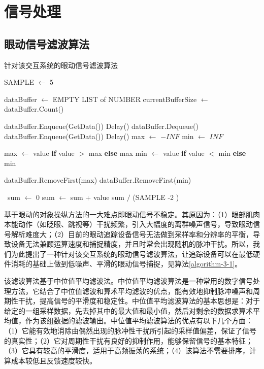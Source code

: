 \section{信号处理}

\subsection{眼动信号滤波算法}

\begin{algorithm}[b!]
    \caption{针对该交互系统的眼动信号滤波算法}
	\begin{algorithmic}[1]
        \State SAMPLE $\leftarrow$ 5
 
        \State dataBuffer $\leftarrow$ EMPTY LIST of NUMBER
        \State currentBufferSize $\leftarrow$ dataBuffer.Count()

            \State dataBuffer.Enqueue(GetData())
            \State Delay()
        \EndFor
        \Else
        \State dataBuffer.Dequeue()
        \State dataBuffer.Enqueue(GetData())
        \State Delay()
        \EndIf
        \State
        \State max $\leftarrow$ $-INF$
        \State min $\leftarrow$ $INF$
        
            \State max $\leftarrow$ value \textbf{if} value $>$ max \textbf{else} max
            \State min $\leftarrow$ value \textbf{if} value $<$ min \textbf{else} min
        \EndFor

        \State dataBuffer.RemoveFirst(max)
        \State dataBuffer.RemoveFirst(min)  

        \
        \State sum $\leftarrow$ 0
            \State sum $\leftarrow$ sum + value
        \EndFor
        \State \Return sum $/$ (SAMPLE -2 )
	\end{algorithmic} 
	\label{algorithm-3-1}
\end{algorithm} 

基于眼动的对象操纵方法的一大难点即眼动信号不稳定。其原因为：（1）眼部肌肉本能动作（如眨眼、跳视等）干扰频繁，引入大幅度的离群噪声信号，导致眼动信号解析难度大；（2）目前的眼动追踪设备信号无法做到采样率和分辨率的平衡，导致设备无法兼顾运算速度和捕捉精度，并且时常会出现随机的脉冲干扰。所以，我们为此提出了一种针对该交互系统的眼动信号滤波算法，让追踪设备可以在最低硬件消耗的基础上做到低噪声、平滑的眼动信号捕捉，见算法\ref{algorithm-3-1}。

该滤波算法基于中位值平均滤波法。中位值平均滤波算法是一种常用的数字信号处理方法，它结合了中位值滤波和算术平均滤波的优点，能有效地抑制脉冲噪声和周期性干扰，提高信号的平滑度和稳定性。中位值平均滤波算法的基本思想是：对于给定的一组采样数据，先去掉其中的最大值和最小值，然后对剩余的数据求算术平均值，作为该组数据的滤波输出。中位值平均滤波算法的优点有以下几个方面：（1）它能有效地消除由偶然出现的脉冲性干扰所引起的采样值偏差，保证了信号的真实性；（2）它对周期性干扰有良好的抑制作用，能够保留信号的基本特征；（3）它具有较高的平滑度，适用于高频振荡的系统；（4）该算法不需要排序，计算成本较低且反馈速度较快。

